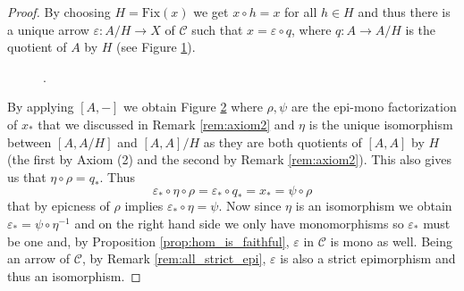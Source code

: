 \documentclass[italian, 12pt, reqno]{article}
\theoremstyle{myteo}
\numberwithin{equation}{section}
\newcommand{\cat}[1]{\mathscr{#1}}
\newcommand{\fix}[1]{\text{Fix}(#1)}
\newcommand{\homs}[2]{[#1, #2]}
\newcommand{\fun}[3]{#1\colon#2\to #3}
\begin{document}
\begin{proof}
	By choosing \(H = \fix{x}\) we get \(x\circ h = x\) for all \(h\in H\) and thus there is a unique arrow \(\fun{\varepsilon}{A/H}{X}\) of \(\cat{C}\) such that \(x = \varepsilon\circ q\), where \(\fun{q}{A}{A/H}\) is the quotient of \(A\) by \(H\) (see Figure \ref{diagram:varepsilon}).
  \begin{figure}
    \begin{center}
      .
    \end{center}
    \caption{}
    \label{diagram:varepsilon}
  \end{figure}
	\begin{figure}
    \begin{center}
    \end{center}
    \caption{}
    \label{diagram:big_diagram}
  \end{figure}

	By applying \(\homs{A}{-}\) we obtain Figure \ref{diagram:big_diagram} where \(\rho, \psi\) are the epi-mono factorization of \(x_*\) that we discussed in Remark \ref{rem:axiom2} and \(\eta\) is the unique isomorphism between \([A, A/H]\) and \([A, A]/H\) as they are both quotients of \([A, A]\) by \(H\) (the first by Axiom (2) and the second by Remark \ref{rem:axiom2}).
        This also gives us that \(\eta \circ \rho = q_*\).
        Thus
  \[\varepsilon_*\circ \eta\circ\rho = \varepsilon_*\circ q_* = x_* = \psi\circ \rho\]
  that by epicness of \(\rho\) implies \(\varepsilon_*\circ \eta = \psi\).
  Now since \(\eta\) is an isomorphism we obtain \(\varepsilon_* = \psi \circ \eta^{-1}\) and on the right hand side we only have monomorphisms so \(\varepsilon_*\) must be one and, by Proposition \ref{prop:hom_is_faithful}, \(\varepsilon\) in \(\cat{C}\) is mono as well.
  Being an arrow of \(\cat{C}\), by Remark \ref{rem:all_strict_epi}, \(\varepsilon\) is also a strict epimorphism and thus an isomorphism.
\end{proof}
\end{document}
